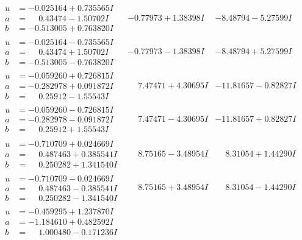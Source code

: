 \documentclass[1p]{elsarticle_modified}
\theoremstyle{definition}
\begin{document}
$$\begin{array}{c|c|c}
\begin{aligned}
u &= -0.025164 + 0.735565 I \\
a &= \phantom{-}0.43474 - 1.50702 I \\
b &= -0.513005 + 0.763820 I\end{aligned}
 & -0.77973 + 1.38398 I & -8.48794 - 5.27599 I \\ \hline\begin{aligned}
u &= -0.025164 - 0.735565 I \\
a &= \phantom{-}0.43474 + 1.50702 I \\
b &= -0.513005 - 0.763820 I\end{aligned}
 & -0.77973 - 1.38398 I & -8.48794 + 5.27599 I \\ \hline\begin{aligned}
u &= -0.059260 + 0.726815 I \\
a &= -0.282978 + 0.091872 I \\
b &= \phantom{-}0.25912 - 1.55543 I\end{aligned}
 & \phantom{-}7.47471 + 4.30695 I & -11.81657 - 0.82827 I \\ \hline\begin{aligned}
u &= -0.059260 - 0.726815 I \\
a &= -0.282978 - 0.091872 I \\
b &= \phantom{-}0.25912 + 1.55543 I\end{aligned}
 & \phantom{-}7.47471 - 4.30695 I & -11.81657 + 0.82827 I \\ \hline\begin{aligned}
u &= -0.710709 + 0.024669 I \\
a &= \phantom{-}0.487463 + 0.385541 I \\
b &= \phantom{-}0.250282 + 1.341540 I\end{aligned}
 & \phantom{-}8.75165 - 3.48954 I & \phantom{-}8.31054 + 1.44290 I \\ \hline\begin{aligned}
u &= -0.710709 - 0.024669 I \\
a &= \phantom{-}0.487463 - 0.385541 I \\
b &= \phantom{-}0.250282 - 1.341540 I\end{aligned}
 & \phantom{-}8.75165 + 3.48954 I & \phantom{-}8.31054 - 1.44290 I \\ \hline\begin{aligned}
u &= -0.459295 + 1.237870 I \\
a &= -1.184610 + 0.482592 I \\
b &= \phantom{-}1.000480 - 0.171236 I\end{aligned}

\end{array}$$
\end{document}
